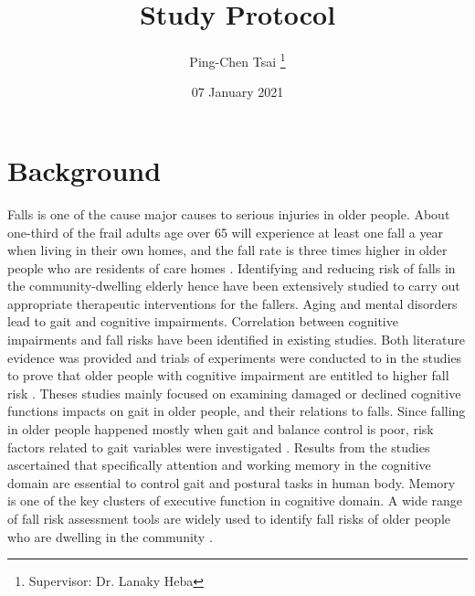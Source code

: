 \documentclass{article}
\title{Study Protocol}
\author{Ping-Chen Tsai  \thanks{Supervisor: Dr. Lanaky Heba}}
\date{07 January 2021}
\begin{document}
\maketitle

\tableofcontents
\pagebreak


\section{Background}
\begin{comment}
Aim: To place the study in the context of available evidence.
The background should be supported by appropriate references to published literature on the area of interest:
•	A thorough literature review of relevant studies and analysis, new research should build on formal review of prior evidence.
•	A brief description of the proposed study.
•	A description of the population to be studied.

It should be written so it is easy to read and understand by someone with a basic sense of the topic who may not necessarily be an expert in the area. Some explanation of terms and concepts is likely to be beneficial. 
\end{comment}

Falls is one of the cause major causes to serious injuries in older people. About one-third of the frail adults age over 65 will experience at least one fall a year when living in their own homes, and the fall rate is three times higher in older people who are residents of care homes \cite{NHSFalls_2018, Robertson_2013}. Identifying and reducing risk of falls in the community-dwelling elderly hence have been extensively studied to carry out appropriate therapeutic interventions for the fallers. Aging and mental disorders lead to gait and cognitive impairments. Correlation between cognitive impairments and fall risks have been identified in existing studies. Both literature evidence was provided and trials of experiments were conducted to in the studies to prove that older people with cognitive impairment are entitled to higher fall risk \cite{Yogev_Seligmann_2007,Martin_2012,Laurence_2017, Zhang_2019}. Theses studies mainly focused on examining damaged or declined cognitive functions impacts on gait in older people, and their relations to falls. Since falling in older people happened mostly when gait and balance control is poor, risk factors related to gait variables were investigated \cite{Zhang_2019, Borowicz_2016}. Results from the studies ascertained that specifically attention and working memory in the cognitive domain are essential to control gait and postural tasks in human body. Memory is one of the key clusters of executive function in cognitive domain. A wide range of fall risk assessment tools are widely used to identify fall risks of older people who are dwelling in the community \cite{PreventionofFalls2011, Mirelman_2012, Kikkert_2017, Park_2017}. 
\end{document}
